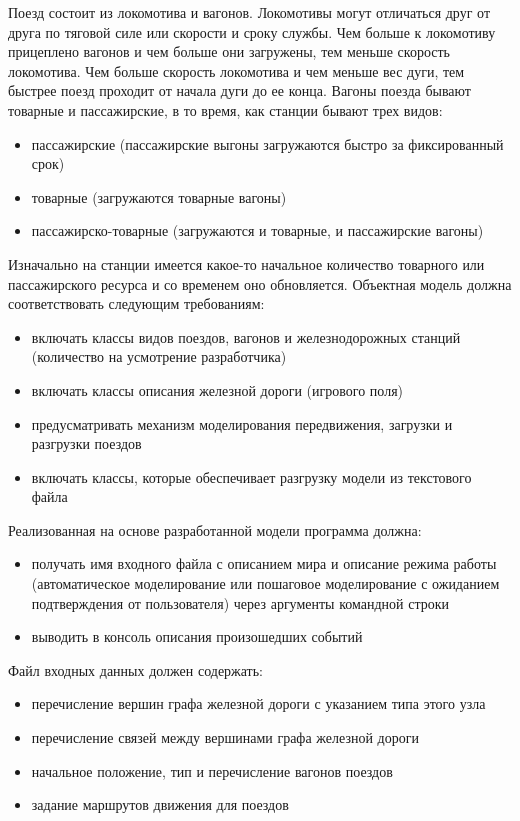 \documentclass[a4paper,12pt]{article}
\begin{document}
Поезд состоит из локомотива и вагонов. Локомотивы могут отличаться
друг от друга по тяговой силе или скорости и сроку службы. Чем больше
к локомотиву прицеплено вагонов и чем больше они загружены, тем меньше
скорость локомотива. Чем больше скорость локомотива и чем меньше вес
дуги, тем быстрее поезд проходит от начала дуги до ее конца. Вагоны
поезда бывают товарные и пассажирские, в то время, как станции бывают
трех видов:

\begin{itemize}
\item пассажирские (пассажирские выгоны загружаются быстро за
  фиксированный срок)
\item товарные (загружаются товарные вагоны)
\item пассажирско-товарные (загружаются и товарные, и пассажирские вагоны)
\end{itemize}

Изначально на станции имеется какое-то начальное количество товарного или пассажирского ресурса и со временем оно обновляется.
Объектная модель должна соответствовать следующим требованиям: 

\begin{itemize}
\item включать классы видов поездов, вагонов и железнодорожных станций
  (количество на усмотрение разработчика)
\item включать классы описания железной дороги (игрового поля)
\item предусматривать механизм моделирования передвижения, загрузки и
  разгрузки поездов
\item включать классы, которые обеспечивает разгрузку модели из
  текстового файла
\end{itemize}

Реализованная на основе разработанной модели программа должна: 

\begin{itemize}
\item получать имя входного файла с описанием мира и описание режима
  работы (автоматическое моделирование или пошаговое моделирование с
  ожиданием подтверждения от пользователя) через аргументы командной
  строки
\item выводить в консоль описания произошедших событий
\end{itemize}

Файл входных данных должен содержать: 

\begin{itemize}
\item перечисление вершин графа железной дороги с указанием типа этого
  узла
\item перечисление связей между вершинами графа железной дороги
\item начальное положение, тип и перечисление вагонов поездов
\item задание маршрутов движения для поездов
\end{itemize}
\end{document}
